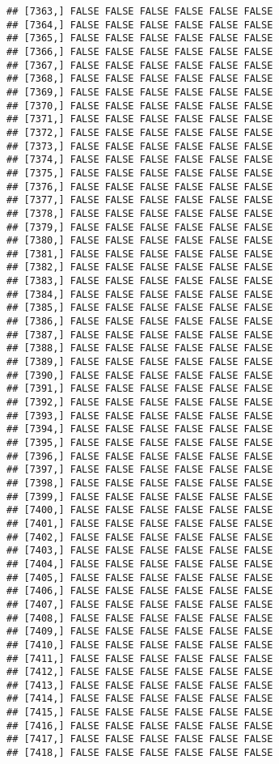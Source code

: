 \documentclass[
]{article}
\begin{document}
\begin{verbatim}
## [7363,] FALSE FALSE FALSE FALSE FALSE FALSE
## [7364,] FALSE FALSE FALSE FALSE FALSE FALSE
## [7365,] FALSE FALSE FALSE FALSE FALSE FALSE
## [7366,] FALSE FALSE FALSE FALSE FALSE FALSE
## [7367,] FALSE FALSE FALSE FALSE FALSE FALSE
## [7368,] FALSE FALSE FALSE FALSE FALSE FALSE
## [7369,] FALSE FALSE FALSE FALSE FALSE FALSE
## [7370,] FALSE FALSE FALSE FALSE FALSE FALSE
## [7371,] FALSE FALSE FALSE FALSE FALSE FALSE
## [7372,] FALSE FALSE FALSE FALSE FALSE FALSE
## [7373,] FALSE FALSE FALSE FALSE FALSE FALSE
## [7374,] FALSE FALSE FALSE FALSE FALSE FALSE
## [7375,] FALSE FALSE FALSE FALSE FALSE FALSE
## [7376,] FALSE FALSE FALSE FALSE FALSE FALSE
## [7377,] FALSE FALSE FALSE FALSE FALSE FALSE
## [7378,] FALSE FALSE FALSE FALSE FALSE FALSE
## [7379,] FALSE FALSE FALSE FALSE FALSE FALSE
## [7380,] FALSE FALSE FALSE FALSE FALSE FALSE
## [7381,] FALSE FALSE FALSE FALSE FALSE FALSE
## [7382,] FALSE FALSE FALSE FALSE FALSE FALSE
## [7383,] FALSE FALSE FALSE FALSE FALSE FALSE
## [7384,] FALSE FALSE FALSE FALSE FALSE FALSE
## [7385,] FALSE FALSE FALSE FALSE FALSE FALSE
## [7386,] FALSE FALSE FALSE FALSE FALSE FALSE
## [7387,] FALSE FALSE FALSE FALSE FALSE FALSE
## [7388,] FALSE FALSE FALSE FALSE FALSE FALSE
## [7389,] FALSE FALSE FALSE FALSE FALSE FALSE
## [7390,] FALSE FALSE FALSE FALSE FALSE FALSE
## [7391,] FALSE FALSE FALSE FALSE FALSE FALSE
## [7392,] FALSE FALSE FALSE FALSE FALSE FALSE
## [7393,] FALSE FALSE FALSE FALSE FALSE FALSE
## [7394,] FALSE FALSE FALSE FALSE FALSE FALSE
## [7395,] FALSE FALSE FALSE FALSE FALSE FALSE
## [7396,] FALSE FALSE FALSE FALSE FALSE FALSE
## [7397,] FALSE FALSE FALSE FALSE FALSE FALSE
## [7398,] FALSE FALSE FALSE FALSE FALSE FALSE
## [7399,] FALSE FALSE FALSE FALSE FALSE FALSE
## [7400,] FALSE FALSE FALSE FALSE FALSE FALSE
## [7401,] FALSE FALSE FALSE FALSE FALSE FALSE
## [7402,] FALSE FALSE FALSE FALSE FALSE FALSE
## [7403,] FALSE FALSE FALSE FALSE FALSE FALSE
## [7404,] FALSE FALSE FALSE FALSE FALSE FALSE
## [7405,] FALSE FALSE FALSE FALSE FALSE FALSE
## [7406,] FALSE FALSE FALSE FALSE FALSE FALSE
## [7407,] FALSE FALSE FALSE FALSE FALSE FALSE
## [7408,] FALSE FALSE FALSE FALSE FALSE FALSE
## [7409,] FALSE FALSE FALSE FALSE FALSE FALSE
## [7410,] FALSE FALSE FALSE FALSE FALSE FALSE
## [7411,] FALSE FALSE FALSE FALSE FALSE FALSE
## [7412,] FALSE FALSE FALSE FALSE FALSE FALSE
## [7413,] FALSE FALSE FALSE FALSE FALSE FALSE
## [7414,] FALSE FALSE FALSE FALSE FALSE FALSE
## [7415,] FALSE FALSE FALSE FALSE FALSE FALSE
## [7416,] FALSE FALSE FALSE FALSE FALSE FALSE
## [7417,] FALSE FALSE FALSE FALSE FALSE FALSE
## [7418,] FALSE FALSE FALSE FALSE FALSE FALSE

\end{verbatim}
\end{document}
